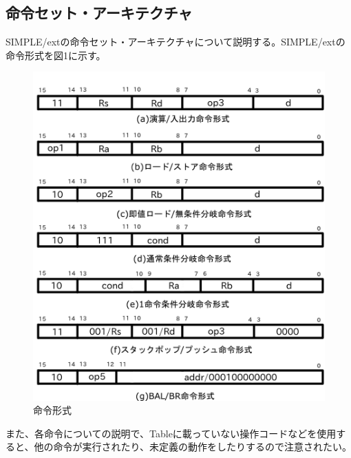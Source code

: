 \documentclass{jarticle}
\begin{document}
\subsection{命令セット・アーキテクチャ}
\hspace{10pt}SIMPLE/extの命令セット・アーキテクチャについて説明する。SIMPLE/extの命令形式を図1に示す。
\begin{figure}[htbp]
  \centering
  \caption{命令形式}
  \includegraphics[width=\hsize]{instform.png}
\end{figure}
また、各命令についての説明で、Tableに載っていない操作コードなどを使用すると、他の命令が実行されたり、未定義の動作をしたりするので注意されたい。
\end{document}
